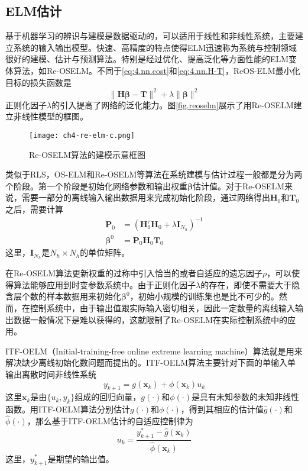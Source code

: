 \subsection{ELM估计}
基于机器学习的辨识与建模是数据驱动的，可以适用于线性和非线性系统，主要建立系统的输入输出模型。快速、高精度的特点使得ELM迅速称为系统与控制领域很好的建模、估计与预测算法。特别是经过优化、提高泛化等方面性能的ELM变体算法，如Re-OSELM。不同于\eqref{eq:4.nn.cost}和\eqref{eq:4.nn.H-T}，ReOS-ELM最小化目标的损失函数是
\begin{equation}\label{eq:4.re.cost}
\|\bm{H}\bm{\beta}-\bm{T}\|^{2}+\lambda\|\bm{\beta}\|^{2}
\end{equation}
正则化因子$\lambda$的引入提高了网络的泛化能力。图\eqref{fig.reoselm}展示了用Re-OSELM建立非线性模型的框图。

\begin{figure}[!htb]
  \centering
  \texttt{[image: ch4-re-elm-c.png]}\\	 %
  \caption{Re-OSELM算法的建模示意框图}
  \label{fig.reoselm}
\end{figure}

类似于RLS，OS-ELM和Re-OSELM等算法在系统建模与估计过程一般都是分为两个阶段。第一个阶段是初始化网络参数和输出权重$\bm{\beta}$估计值。对于Re-OSELM来说，需要一部分的离线输入输出数据用来完成初始化阶段，通过网络得出$\bm{H}_{0}$和$\bm{T}_{0}$之后，需要计算
\begin{equation}
\begin{split}%
\bm{P}_{0}&=(\bm{H}_{0}^{\tau}\bm{H}_{0}+\lambda \bm{I}_{N_{h}})^{-1}\\
\bm{\beta}^{0}&=\bm{P}_{0}\bm{H}_{0}\bm{T}_{0}
\end{split}
\end{equation}
这里，$\bm{I}_{N_{h}}$是$N_{h}\times N_{h}$的单位矩阵。

在Re-OSELM算法更新权重的过称中引入恰当的或者自适应的遗忘因子$\rho$，可以使得算法能够应用到时变参数系统中。由于正则化因子$\lambda$的存在，即使不需要大于隐含层个数的样本数据用来初始化$\bm{\beta}^{0}$，初始小规模的训练集也是比不可少的。然而，在控制系统中，由于输出值跟实际输入密切相关，因此一定数量的离线输入输出数据一般情况下是难以获得的，这就限制了Re-OSELM在实际控制系统中的应用。

ITF-OELM（Initial-training-free online extreme learning machine）算法就是用来解决缺少离线初始化数问题而提出的。ITF-OELM算法主要针对下面的单输入单输出离散时间非线性系统
\begin{equation}\label{eq:4.siso}
y_{k+1} = g(\bm{x}_{k})+\phi(\bm{x}_{k})u_{k}
\end{equation}
这里$\bm{x}_{k}$是由$\{u_{k},y_{k}\}$组成的回归向量，$g(\cdot)$和$\phi(\cdot)$是具有未知参数的未知非线性函数。用ITF-OELM算法分别估计$g(\cdot)$和$\phi(\cdot)$，得到其相应的估计值$\hat{g}(\cdot)$和$\hat{\phi}(\cdot)$，那么基于ITF-OELM估计的自适应控制律为
\begin{equation}\label{eq:4.itf.u}
u_{k}=\frac{y_{k+1}^{*}-\hat{g}(\bm{x}_{k})}{\hat{\phi}(\bm{x}_{k})} 
\end{equation}
这里，$y_{k+1}^{*}$是期望的输出值。

